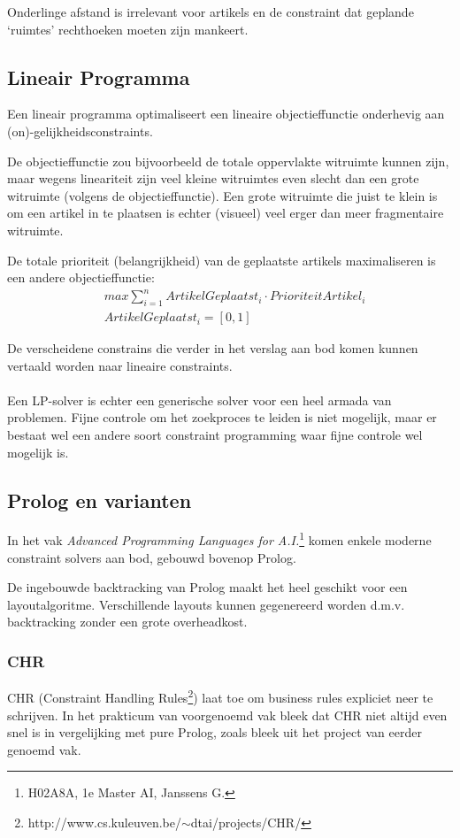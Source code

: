 \documentclass[a4paper,12pt]{report}
\begin{document}
Onderlinge afstand is irrelevant voor artikels en de constraint dat geplande `ruimtes' rechthoeken moeten zijn mankeert.

		\subsection{Lineair Programma}
Een lineair programma optimaliseert een lineaire objectieffunctie onderhevig aan (on)-gelijkheidsconstraints.

De objectieffunctie zou bijvoorbeeld de totale oppervlakte witruimte kunnen zijn, maar wegens lineariteit zijn veel kleine witruimtes even slecht dan een grote witruimte (volgens de objectieffunctie). Een grote witruimte die juist te klein is om een artikel in te plaatsen is echter (visueel) veel erger dan meer fragmentaire witruimte.

De totale  prioriteit (belangrijkheid) van de geplaatste artikels maximaliseren is een andere objectieffunctie:
\begin{eqnarray*}
	&max \sum_{i=1}^{n}{ArtikelGeplaatst_i \cdot PrioriteitArtikel_i} \\
	& ArtikelGeplaatst_i = [0,1]
\end{eqnarray*}

De verscheidene constrains die verder in het verslag aan bod komen kunnen vertaald worden naar lineaire constraints.
\\
\\
Een LP-solver is echter een generische solver voor een heel armada van problemen. Fijne controle om het zoekproces te leiden is niet mogelijk, maar er bestaat wel een andere soort constraint programming waar fijne controle wel mogelijk is.

		\subsection{Prolog en varianten}
In het vak \textit{Advanced Programming Languages for A.I.}\footnote{H02A8A, 1e Master AI, Janssens G.} komen enkele moderne constraint solvers aan bod, gebouwd bovenop Prolog.

De ingebouwde backtracking van Prolog maakt het heel geschikt voor een layoutalgoritme. Verschillende layouts kunnen gegenereerd worden d.m.v. backtracking zonder een grote overheadkost.
			
			\subsubsection{CHR}
CHR (Constraint Handling Rules\footnote{http://www.cs.kuleuven.be/$\sim$dtai/projects/CHR/}) laat toe om business rules expliciet neer te schrijven. In het prakticum van voorgenoemd vak bleek dat CHR niet altijd even snel is in vergelijking met pure Prolog, zoals bleek uit het project van eerder genoemd vak.
			
\end{document}
